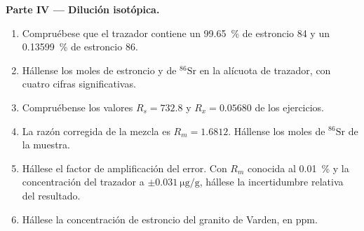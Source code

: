 \begin{problem}
\noindent\textbf{Parte IV --- Dilución isotópica.}
\begin{enumerate}[resume]
  \item Compruébese que el trazador contiene un \qty{99.65}{\percent} de estroncio 84 y un \qty{0.13599}{\percent}
        de estroncio 86.
  \item Hállense los moles de estroncio y de $^{86}\mathrm{Sr}$ en la alícuota de trazador, con cuatro
        cifras significativas.
  \item Compruébense los valores $R_s = 732.8$ y $R_x = 0.05680$ de los ejercicios.
  \item La razón corregida de la mezcla es $R_m = 1.6812$. Hállense los moles de $^{86}\mathrm{Sr}$
        de la muestra.
  \item Hállese el factor de amplificación del error. Con $R_m$ conocida al \qty{0.01}{\percent} y la concentración del
        trazador a $\pm\qty{0.031}{\micro\gram\per\gram}$, hállese la incertidumbre relativa
        del resultado.
  \item Hállese la concentración de estroncio del granito de Varden, en ppm.
\end{enumerate}
\end{problem}
